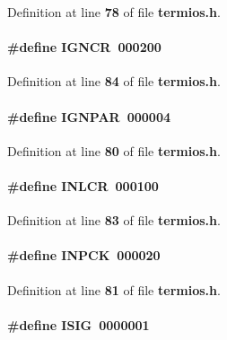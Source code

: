Definition at line {\bf 78} of file {\bf termios.\+h}.

\paragraph[{I\+G\+N\+CR}]{\setlength{\rightskip}{0pt plus 5cm}\#define I\+G\+N\+CR~000200}\label{termios_8h_ab114b7d41f2ff7562a85ec83b62544b0}


Definition at line {\bf 84} of file {\bf termios.\+h}.

\paragraph[{I\+G\+N\+P\+AR}]{\setlength{\rightskip}{0pt plus 5cm}\#define I\+G\+N\+P\+AR~000004}\label{termios_8h_a4fed5823391b245f7024acc621e4131f}


Definition at line {\bf 80} of file {\bf termios.\+h}.

\paragraph[{I\+N\+L\+CR}]{\setlength{\rightskip}{0pt plus 5cm}\#define I\+N\+L\+CR~000100}\label{termios_8h_acc6dc46be5104b67ffde1df93549472a}


Definition at line {\bf 83} of file {\bf termios.\+h}.

\paragraph[{I\+N\+P\+CK}]{\setlength{\rightskip}{0pt plus 5cm}\#define I\+N\+P\+CK~000020}\label{termios_8h_abd0c2389a768405ef39c86fe8cf5c7ec}


Definition at line {\bf 81} of file {\bf termios.\+h}.

\paragraph[{I\+S\+IG}]{\setlength{\rightskip}{0pt plus 5cm}\#define I\+S\+IG~0000001}\label{termios_8h_a52c605497d066b9ae7407124f84806a7}


